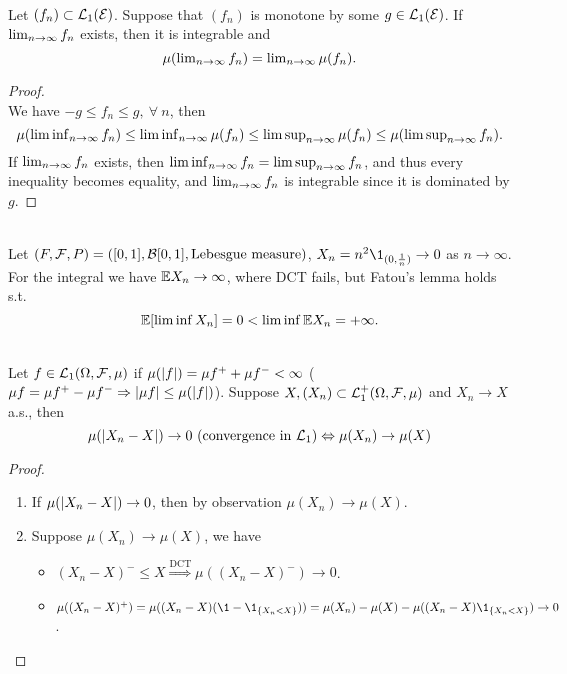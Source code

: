 \vspace{6pt}
\begin{theorem}\label{DCT}\ \\
Let $(f_n) \subset \mathcal{L}_1(\mathcal{E})$. Suppose that $(f_n)$ is monotone by some $g \in \mathcal{L}_1(\mathcal{E})$. If $\textstyle\lim_{n \to \infty} f_n$ exists, then it is integrable and 
\begin{equation*}
    \mu(\textstyle\lim_{n \to \infty} f_n) = \textstyle\lim_{n \to \infty} \mu(f_n).
\end{equation*}
\end{theorem}
\begin{proof}\ \\
We have $- g \leq f_n \leq g,\ \forall\ n$, then
\begin{equation*}
    \mu(\textstyle\liminf_{n \to \infty} f_n) \leq \textstyle\liminf_{n \to \infty} \mu(f_n) \leq \textstyle\limsup_{n \to \infty} \mu(f_n) \leq \mu(\textstyle\limsup_{n \to \infty} f_n).
\end{equation*}
If $\textstyle\lim_{n \to \infty} f_n$ exists, then $\textstyle\liminf_{n \to \infty} f_n = \textstyle\limsup_{n \to \infty} f_n$, and thus every inequality becomes equality, and $\textstyle\lim_{n \to \infty} f_n$ is integrable since it is dominated by $g$.
\end{proof}

\begin{example}\ \\
Let $(F,\mathcal{F},P) = ([0,1],\mathcal{B}[0,1], \text{Lebesgue measure})$, $X_n = n^2 \1_{(0,\frac{1}{n})} \to 0$ as $n \to \infty$. For the integral we have $\mathbb{E} X_n \to \infty$, where DCT fails, but Fatou's lemma holds s.t.
\begin{equation*}
    \mathbb{E}[\liminf X_n] = 0 < \liminf \mathbb{E} X_n = +\infty.
\end{equation*}
\end{example}

\vspace{6pt}
\begin{corollary}\ \\
Let $f \in \mathcal{L}_1(\Omega, \mathcal{F}, \mu)$ if $\mu(\abs{f}) = \mu f^+ + \mu f^- < \infty$ ($\mu f = \mu f^+ - \mu f^-  \Rightarrow \abs{\mu f} \leq \mu(\abs{f})$). Suppose $X, (X_n) \subset \mathcal{L}_1^+(\Omega, \mathcal{F}, \mu)$ and $X_n \to X$ a.s., then 
\begin{equation*}
    \mu(\abs{X_n - X}) \to 0\ (\text{convergence in } \Ls_1) \Leftrightarrow \mu(X_n) \to \mu(X)
\end{equation*}
\end{corollary}
\begin{proof}\
\begin{enumerate}
    \item If $\mu(\abs{X_n - X}) \to 0$, then by observation $\mu(X_n) \to \mu(X)$.
    \item Suppose $\mu(X_n) \to \mu(X)$, we have 
    \begin{itemize}
        \item $(X_n - X)^{-} \leq X \overset{\mathrm{DCT}}{\Rightarrow} \mu((X_n - X)^-) \to 0$.
        \item $\mu((X_n - X)^+) = \mu((X_n - X) (\1 - \1_{\{X_n < X\}})) = \mu(X_n) - \mu(X) - \mu((X_n - X)\1_{\{X_n < X\}}) \to 0$.
    \end{itemize}
\end{enumerate}
\end{proof}


